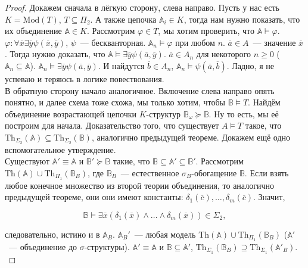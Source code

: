 \begin{proof}
    Докажем сначала в лёгкую сторону, слева направо. Пусть у нас есть $K = \text{Mod}(T)$, $T \subseteq \Pi_2$. А также цепочка $\mathbb{A}_i \in K$, тогда нам нужно показать, что их объединение $\mathbb{A} \in K$. Рассмотрим $\varphi \in T$, мы хотим проверить, что $\mathbb{A} \models \varphi$. $\varphi: \forall \overline{x} \exists \overline{y} \psi (\overline{x}, \overline{y})$, $\psi$~— бескванторная. $\mathbb{A}_n \models \varphi$ при любом $n$. $\overline{a} \in A$~— значение $\overline{x}$. Тогда нужно доказать, что $\mathbb{A} \models \exists \overline{y} \psi(\overline{a}, \overline{y})$. $\overline{a} \in A_n$ для некоторого $n \geq 0$ ($\mathbb{A}_n \subseteq \mathbb{A}$). $\mathbb{A}_n \models \exists \overline{y} \psi (\overline{a}, \overline{y})$. И найдутся $\overline{b} \in A_n$, $\mathbb{A}_n \models \psi(\overline{a}, \overline{b})$. Ладно, я не успеваю и теряюсь в логике повествования. \\ 

    В обратную сторону начало аналогичное. Включение слева направо опять понятно, и далее схема тоже схожа, мы только хотим, чтобы $\mathbb{B} \models T$. Найдём объединение возрастающей цепочки $K$-структур $\mathbb{B}_\omega \succeq \mathbb{B}$. Ну то есть, мы её построим для начала. Доказательство того, что существует $A \models T$ такое, что $\text{Th}_{\Sigma_2}(\mathbb{A}) \subseteq \text{Th}_{\Sigma_2}(\mathbb{B})$, аналогично предыдущей теореме. Докажем ещё одно вспомогательное утверждение. \\ 

    Существуют $\mathbb{A}' \equiv \mathbb{A}$ и $\mathbb{B}' \succeq \mathbb{B}$ такие, что $\mathbb{B} \subseteq \mathbb{A}' \subseteq \mathbb{B}'$. Рассмотрим $\text{Th}(\mathbb{A}) \cup \text{Th}_{\Pi_1}(\mathbb{B}_B)$, где $\mathbb{B}_B$~— естественное $\sigma_B$-обогащение $\mathbb{B}$. Если взять любое конечное множество из второй теории объединения, то аналогично предыдущей теореме, они они имеют константы: $\delta_1(\overline{c}), \ldots, \delta_m(\overline{c})$. Значит, 

    \[ 
        \mathbb{B} \models \exists \overline{x} (\delta_1(\overline{x}) \wedge \ldots \wedge \delta_m(\overline{x})) \in \Sigma_2,
    \]

    следовательно, истино и в $\mathbb{A}_B$. $\mathbb{A}_B'$~— любая модель $\text{Th}(\mathbb{A}) \cup \text{Th}_{\Pi_1}(\mathbb{B}_B)$ ($\mathbb{A}'$~— объединение до $\sigma$-структуры). $\mathbb{A}' \equiv \mathbb{A}$ и $\mathbb{B} \subseteq \mathbb{A}'$, $\text{Th}_{\Sigma_1}(\mathbb{B}_B) \supseteq \text{Th}_{\Sigma_1}(\mathbb{A}'_B)$. \\ 


\end{proof}
